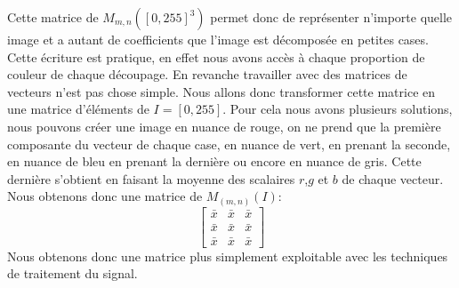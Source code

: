 \documentclass[a4paper,12pt,titlepage]{report}
\begin{document}
		Cette matrice de $ M_{m,n}([0,255]^3)$ permet donc de représenter n'importe quelle image et a autant de coefficients que l'image est décomposée en petites cases.
		Cette écriture est pratique, en effet nous avons accès à chaque proportion de couleur de chaque découpage. En revanche travailler avec des matrices de vecteurs n'est pas chose simple. Nous allons donc transformer cette matrice en une matrice d'éléments de $I=[0,255]$. Pour cela nous avons plusieurs solutions, nous pouvons créer une image en nuance de rouge, on ne prend que la première composante du vecteur de chaque case, en nuance de vert, en prenant la seconde, en nuance de bleu en prenant la dernière ou encore en nuance de gris. Cette dernière s'obtient en faisant la moyenne des scalaires $r$,$g$ et $b$ de chaque vecteur. Nous obtenons donc une matrice de $M_{(m,n)}(I)$:
		\begin{equation}
		\begin{bmatrix} 
		\bar{x} & \bar{x} & \bar{x} 
		\\  \bar{x} & \bar{x} & \bar{x} 
		\\  \bar{x} & \bar{x} & \bar{x}
		\end{bmatrix}
		\end{equation}
		Nous obtenons donc une matrice plus simplement exploitable avec les techniques de traitement du signal.
\end{document}
